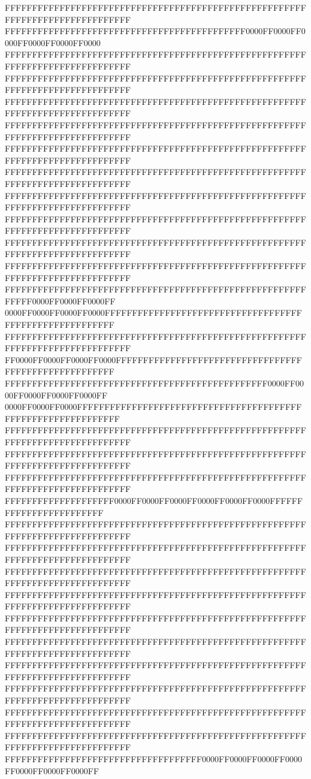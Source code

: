 FFFFFFFFFFFFFFFFFFFFFFFFFFFFFFFFFFFFFFFFFFFFFFFFFFFFFFFFFFFFFFFFFFFFFFFFFFFFFF
FFFFFFFFFFFFFFFFFFFFFFFFFFFFFFFFFFFFFFFFFFFF0000FF0000FF0000FF0000FF0000FF0000
FFFFFFFFFFFFFFFFFFFFFFFFFFFFFFFFFFFFFFFFFFFFFFFFFFFFFFFFFFFFFFFFFFFFFFFFFFFFFF
FFFFFFFFFFFFFFFFFFFFFFFFFFFFFFFFFFFFFFFFFFFFFFFFFFFFFFFFFFFFFFFFFFFFFFFFFFFFFF
FFFFFFFFFFFFFFFFFFFFFFFFFFFFFFFFFFFFFFFFFFFFFFFFFFFFFFFFFFFFFFFFFFFFFFFFFFFFFF
FFFFFFFFFFFFFFFFFFFFFFFFFFFFFFFFFFFFFFFFFFFFFFFFFFFFFFFFFFFFFFFFFFFFFFFFFFFFFF
FFFFFFFFFFFFFFFFFFFFFFFFFFFFFFFFFFFFFFFFFFFFFFFFFFFFFFFFFFFFFFFFFFFFFFFFFFFFFF
FFFFFFFFFFFFFFFFFFFFFFFFFFFFFFFFFFFFFFFFFFFFFFFFFFFFFFFFFFFFFFFFFFFFFFFFFFFFFF
FFFFFFFFFFFFFFFFFFFFFFFFFFFFFFFFFFFFFFFFFFFFFFFFFFFFFFFFFFFFFFFFFFFFFFFFFFFFFF
FFFFFFFFFFFFFFFFFFFFFFFFFFFFFFFFFFFFFFFFFFFFFFFFFFFFFFFFFFFFFFFFFFFFFFFFFFFFFF
FFFFFFFFFFFFFFFFFFFFFFFFFFFFFFFFFFFFFFFFFFFFFFFFFFFFFFFFFFFFFFFFFFFFFFFFFFFFFF
FFFFFFFFFFFFFFFFFFFFFFFFFFFFFFFFFFFFFFFFFFFFFFFFFFFFFFFFFFFFFFFFFFFFFFFFFFFFFF
FFFFFFFFFFFFFFFFFFFFFFFFFFFFFFFFFFFFFFFFFFFFFFFFFFFFFFFFFFFF0000FF0000FF0000FF
0000FF0000FF0000FF0000FFFFFFFFFFFFFFFFFFFFFFFFFFFFFFFFFFFFFFFFFFFFFFFFFFFFFFFF
FFFFFFFFFFFFFFFFFFFFFFFFFFFFFFFFFFFFFFFFFFFFFFFFFFFFFFFFFFFFFFFFFFFFFFFFFFFFFF
FF0000FF0000FF0000FF0000FFFFFFFFFFFFFFFFFFFFFFFFFFFFFFFFFFFFFFFFFFFFFFFFFFFFFF
FFFFFFFFFFFFFFFFFFFFFFFFFFFFFFFFFFFFFFFFFFFFFFFF0000FF0000FF0000FF0000FF0000FF
0000FF0000FF0000FFFFFFFFFFFFFFFFFFFFFFFFFFFFFFFFFFFFFFFFFFFFFFFFFFFFFFFFFFFFFF
FFFFFFFFFFFFFFFFFFFFFFFFFFFFFFFFFFFFFFFFFFFFFFFFFFFFFFFFFFFFFFFFFFFFFFFFFFFFFF
FFFFFFFFFFFFFFFFFFFFFFFFFFFFFFFFFFFFFFFFFFFFFFFFFFFFFFFFFFFFFFFFFFFFFFFFFFFFFF
FFFFFFFFFFFFFFFFFFFFFFFFFFFFFFFFFFFFFFFFFFFFFFFFFFFFFFFFFFFFFFFFFFFFFFFFFFFFFF
FFFFFFFFFFFFFFFFFFFF0000FF0000FF0000FF0000FF0000FF0000FFFFFFFFFFFFFFFFFFFFFFFF
FFFFFFFFFFFFFFFFFFFFFFFFFFFFFFFFFFFFFFFFFFFFFFFFFFFFFFFFFFFFFFFFFFFFFFFFFFFFFF
FFFFFFFFFFFFFFFFFFFFFFFFFFFFFFFFFFFFFFFFFFFFFFFFFFFFFFFFFFFFFFFFFFFFFFFFFFFFFF
FFFFFFFFFFFFFFFFFFFFFFFFFFFFFFFFFFFFFFFFFFFFFFFFFFFFFFFFFFFFFFFFFFFFFFFFFFFFFF
FFFFFFFFFFFFFFFFFFFFFFFFFFFFFFFFFFFFFFFFFFFFFFFFFFFFFFFFFFFFFFFFFFFFFFFFFFFFFF
FFFFFFFFFFFFFFFFFFFFFFFFFFFFFFFFFFFFFFFFFFFFFFFFFFFFFFFFFFFFFFFFFFFFFFFFFFFFFF
FFFFFFFFFFFFFFFFFFFFFFFFFFFFFFFFFFFFFFFFFFFFFFFFFFFFFFFFFFFFFFFFFFFFFFFFFFFFFF
FFFFFFFFFFFFFFFFFFFFFFFFFFFFFFFFFFFFFFFFFFFFFFFFFFFFFFFFFFFFFFFFFFFFFFFFFFFFFF
FFFFFFFFFFFFFFFFFFFFFFFFFFFFFFFFFFFFFFFFFFFFFFFFFFFFFFFFFFFFFFFFFFFFFFFFFFFFFF
FFFFFFFFFFFFFFFFFFFFFFFFFFFFFFFFFFFFFFFFFFFFFFFFFFFFFFFFFFFFFFFFFFFFFFFFFFFFFF
FFFFFFFFFFFFFFFFFFFFFFFFFFFFFFFFFFFFFFFFFFFFFFFFFFFFFFFFFFFFFFFFFFFFFFFFFFFFFF
FFFFFFFFFFFFFFFFFFFFFFFFFFFFFFFFFFFF0000FF0000FF0000FF0000FF0000FF0000FF0000FF
